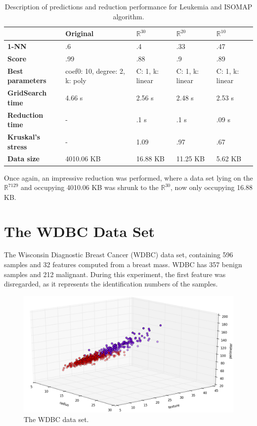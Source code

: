 \begin{table}[H]
	\centering
	
	\begin{tabular}{|p{.15\linewidth}|p{.15\linewidth}|p{.15\linewidth}|p{.15\linewidth}|p{.15\linewidth}|}
		\hline
		& \textbf{Original} & $\mathbb{R}^{30}$ & $\mathbb{R}^{20}$ & $\mathbb{R}^{10}$ \\\hline
		\textbf{1-NN} & .6 & .4 & .33 & .47\\\hline
		\textbf{Score} & .99 & .88 & .9 & .89 \\\hline
		\textbf{Best parameters} & coef0: 10, degree: 2, k: poly & C: 1, k: linear & C: 1, k: linear & C: 1, k: linear \\\hline
		\textbf{GridSearch time} & 4.66 s & 2.56 s & 2.48 s & 2.53 s \\\hline
		\textbf{Reduction time} & - & .1 s & .1 s & .09 s \\\hline
		\textbf{Kruskal's stress} & - & 1.09 & .97 & .67 \\\hline
		\textbf{Data size} & 4010.06 KB & 16.88 KB & 11.25 KB & 5.62 KB \\\hline
	\end{tabular}
	\captionsetup{justification=centering}
	\caption{Description of predictions and reduction performance for Leukemia and ISOMAP algorithm.}
\end{table}

Once again, an impressive reduction was performed, where a data set lying on the $\mathbb{R}^{7129}$ and occupying 4010.06 KB was shrunk to the $\mathbb{R}^{30}$, now only occupying 16.88 KB.
\clearpage

\section{The WDBC Data Set}

The Wisconsin Diagnostic Breast Cancer (WDBC) data set, containing 596 samples and 32 features computed from a breast mass. WDBC has 357 benign samples and 212 malignant. During this experiment, the first feature was disregarded, as it represents the identification numbers of the samples.
\newline\newline

\begin{figure}[H]
	\centering
	\includegraphics[width=\linewidth]{img/datasets/wdbc}
	\captionsetup{justification=centering}
	\caption{The WDBC data set.}
	\label{fig:dswdbc}
\end{figure}

